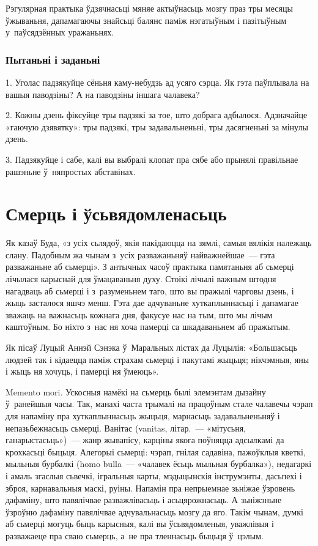 Рэгулярная практыка ўдзячнасьці мяняе актыўнасьць мозгу праз тры месяцы ўжываньня, дапамагаючы знайсьці балянс паміж нэгатыўным і пазітыўным у~паўсядзённых уражаньнях.

\subsubsection{Пытаньні і заданьні}

1. Уголас падзякуйце сёньня каму-небудзь ад усяго сэрца. Як гэта паўплывала на вашыя паводзіны? А на паводзіны іншага чалавека?

2. Кожны дзень фіксуйце тры падзякі за тое, што добрага адбылося. Адзначайце «гаючую дзявятку»: тры падзякі, тры задавальненьні, тры дасягненьні за мінулы дзень.

3. Падзякуйце і сабе, калі вы выбралі клопат пра сябе або прынялі правільнае рашэньне ў~няпростых абставінах.


\section{Смерць і ўсьвядомленасьць}

Як казаў Буда, «з усіх сьлядоў, якія пакідаюцца на зямлі, самыя вялікія належаць слану. Падобным жа чынам з~усіх разважаньняў найважнейшае~--- гэта разважаньне аб сьмерці». З антычных часоў практыка памятаньня аб сьмерці лічылася карыснай для ўмацаваньня духу. Стоікі лічылі важным штодня нагадваць аб сьмерці і з~разуменьнем таго, што вы пражылі чарговы дзень, і жыць засталося яшчэ менш. Гэта дае адчуваньне хуткаплыннасьці і дапамагае зважаць на важнасьць кожнага дня, факусуе нас на тым, што мы лічым каштоўным. Бо ніхто з~нас ня хоча памерці са шкадаваньнем аб пражытым.

Як пісаў Луцый Аннэй Сэнэка ў~Маральных лістах да Луцылія: «Большасьць людзей так і кідаецца паміж страхам сьмерці і пакутамі жыцьця; нікчэмныя, яны і жыць ня хочуць, і памерці ня ўмеюць».

Memento mori. Ускосныя намёкі на сьмерць былі элемэнтам дызайну ў~ранейшыя часы. Так, манахі часта трымалі на працоўным стале чалавечы чэрап для напаміну пра хуткаплыннасьць жыцьця, марнасьць задавальненьняў і непазьбежнасьць сьмерці. Ванітас (vanitas, літар.~--- «мітусьня, ганарыстасьць»)~--- жанр жывапісу, карціны якога поўняцца адсылкамі да крохкасьці быцьця. Алегорыі сьмерці: чэрап, гнілая садавіна, пажоўклыя кветкі, мыльныя бурбалкі (homo bulla~--- «чалавек ёсьць мыльная бурбалка»), недагаркі і амаль згаслыя сьвечкі, ігральныя карты, мэдыцынскія інструмэнты, дасьпехі і зброя, карнавальныя маскі, руіны. Напамін пра непрыемнае зьніжае ўзровень дафаміну, што павялічвае разважлівасьць і асьцярожнасьць. А зьніжэньне ўзроўню дафаміну павялічвае адчувальнасьць мозгу да яго. Такім чынам, думкі аб сьмерці могуць быць карысныя, калі вы ўсьвядомленыя, уважлівыя і разважаеце пра сваю сьмерць, а~не пра тленнасьць быцьця ў~цэлым.

